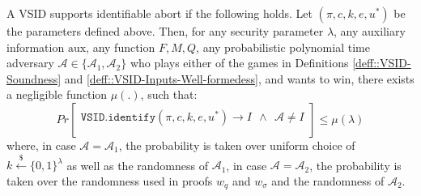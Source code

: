 \begin{definition}\label{def::VSID-Identifiable-Abort}  A  VSID  supports  identifiable abort   if the following holds.  Let  $(\pi,c,k,e,u^{\scriptscriptstyle *})$ be the parameters defined above. Then,  for any  security parameter $\lambda$, any auxiliary information $\text{aux}$, any  function $F, M,Q$, any probabilistic polynomial time adversary $\mathcal{A}\in \{\mathcal{A}_{\scriptscriptstyle 1},\mathcal{A}_{\scriptscriptstyle 2}\}$ who plays either of the  games in Definitions \ref{deff::VSID-Soundness} and \ref{deff::VSID-Inputs-Well-formedess}, and wants to win, there exists a negligible function $\mu(.)$, such that: 
\small{
$$ Pr\left[
  \begin{array}{l}
\mathtt{VSID.identify}(\pi,c,k,e,u^{\scriptscriptstyle *})\rightarrow I \  \ \wedge \ \ \mathcal{A}\neq I\\

\end{array} 
    \right]\leq \mu(\lambda)$$
}
where, in case $\mathcal{A}=\mathcal{A}_{\scriptscriptstyle 1}$, the probability is taken over uniform  choice of $k\stackrel{\scriptscriptstyle\$}\leftarrow \{0,1\}^{\scriptscriptstyle\lambda}$ as well as the randomness of $\mathcal{A}_{\scriptscriptstyle 1}$, in case $\mathcal{A}=\mathcal{A}_{\scriptscriptstyle 2}$, the probability is taken over the randomness used in  proofs $w_{\scriptscriptstyle q}$ and $w_{\scriptscriptstyle\sigma}$  and the randomness of $\mathcal{A}_{\scriptscriptstyle 2}$.
\end{definition}





















